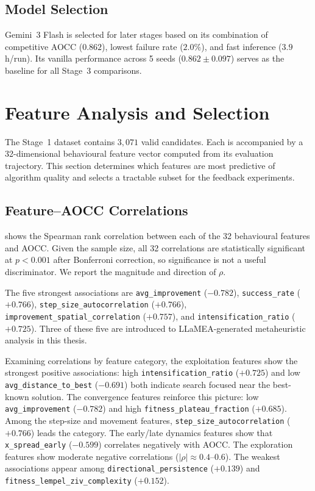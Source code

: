 \subsection{Model Selection}
\label{sec:results-model-selection}


Gemini~3 Flash is selected for later stages based on its combination of competitive AOCC ($0.862$), lowest failure rate ($2.0\%$), and fast inference ($3.9$\,h/run). Its vanilla performance across 5 seeds ($0.862 \pm 0.097$) serves as the baseline for all Stage~3 comparisons.

\section{Feature Analysis and Selection}
\label{sec:results-features}

The Stage~1 dataset contains $3{,}071$ valid candidates. Each is accompanied by a 32-dimensional behavioural feature vector computed from its evaluation trajectory. This section determines which features are most predictive of algorithm quality and selects a tractable subset for the feedback experiments.

\subsection{Feature--AOCC Correlations}
\label{sec:results-correlations}

 shows the Spearman rank correlation between each of the 32 behavioural features and AOCC. Given the sample size, all 32 correlations are statistically significant at $p < 0.001$ after Bonferroni correction, so significance is not a useful discriminator. We report the magnitude and direction of $\rho$.

The five strongest associations are \texttt{avg\_improvement} ($-0.782$), \texttt{success\_rate} ($+0.766$), \texttt{step\_size\_autocorrelation} ($+0.766$), \texttt{improvement\_spatial\_correlation} ($+0.757$), and \texttt{intensification\_ratio} ($+0.725$). Three of these five are introduced to LLaMEA-generated metaheuristic analysis in this thesis.

Examining correlations by feature category, the exploitation features show the strongest positive associations: high \texttt{intensification\_ratio} ($+0.725$) and low \texttt{avg\_distance\_to\_best} ($-0.691$) both indicate search focused near the best-known solution. The convergence features reinforce this picture: low \texttt{avg\_improvement} ($-0.782$) and high \texttt{fitness\_plateau\_fraction} ($+0.685$). Among the step-size and movement features, \texttt{step\_size\_autocorrelation} ($+0.766$) leads the category. The early/late dynamics features show that \texttt{x\_spread\_early} ($-0.599$) correlates negatively with AOCC. The exploration features show moderate negative correlations ($|\rho| \approx 0.4$--$0.6$). The weakest associations appear among \texttt{directional\_persistence} ($+0.139$) and \texttt{fitness\_lempel\_ziv\_complexity} ($+0.152$).

